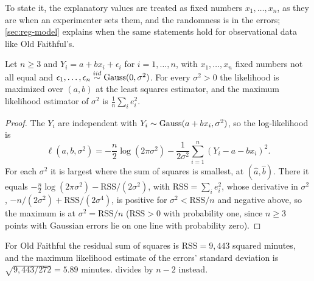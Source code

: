 To state it, the explanatory values are treated as fixed numbers $x_1, \ldots, x_n$, as they are when an experimenter sets them, and the randomness is in the errors; \cref{sec:reg-model} explains when the same statements hold for observational data like Old Faithful's.

\begin{proposition}
\label{prop:lse-mle}
Let $n \geq 3$ and $Y_i = a + bx_i + \epsilon_i$ for $i = 1, \ldots, n$, with $x_1, \ldots, x_n$ fixed numbers not all equal and $\epsilon_1, \ldots, \epsilon_n \stackrel{iid}{\sim} \text{Gauss}(0, \sigma^2)$.
For every $\sigma^2 > 0$ the likelihood is maximized over $(a, b)$ at the least squares estimator, and the maximum likelihood estimator of $\sigma^2$ is $\frac1n\sum_i e_i^2$.
\end{proposition}
\begin{proof}
The $Y_i$ are independent with $Y_i \sim \text{Gauss}(a + bx_i, \sigma^2)$, so the log-likelihood is
\[
\ell(a, b, \sigma^2) = -\frac{n}{2}\log(2\pi\sigma^2) - \frac{1}{2\sigma^2}\sum_{i=1}^n (Y_i - a - bx_i)^2.
\]
For each $\sigma^2$ it is largest where the sum of squares is smallest, at $(\hat{a}, \hat{b})$.
There it equals $-\frac{n}{2}\log(2\pi\sigma^2) - \mathrm{RSS}/(2\sigma^2)$, with $\mathrm{RSS} = \sum_i e_i^2$, whose derivative in $\sigma^2$, $-n/(2\sigma^2) + \mathrm{RSS}/(2\sigma^4)$, is positive for $\sigma^2 < \mathrm{RSS}/n$ and negative above, so the maximum is at $\sigma^2 = \mathrm{RSS}/n$ ($\mathrm{RSS} > 0$ with probability one, since $n \geq 3$ points with Gaussian errors lie on one line with probability zero).
\end{proof}

For Old Faithful the residual sum of squares is $\mathrm{RSS} = 9{,}443$ squared minutes, and the maximum likelihood estimate of the errors' standard deviation is $\sqrt{9{,}443/272} = 5.89$ minutes.
 divides by $n - 2$ instead.

